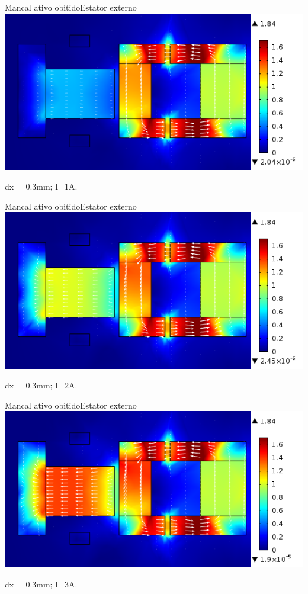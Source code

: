 \documentclass{beamer}
\begin{document}
\begin{frame}{Mancal ativo obitido}{Estator externo}
\includegraphics[width=1\linewidth]{Simulacoes/Ativo/dx=03_I=1}

dx = 0.3mm; I=1A.
\end{frame}

\begin{frame}{Mancal ativo obitido}{Estator externo}
\includegraphics[width=1\linewidth]{Simulacoes/Ativo/dx=03_I=2}

dx = 0.3mm; I=2A.
\end{frame}

\begin{frame}{Mancal ativo obitido}{Estator externo}
\includegraphics[width=1\linewidth]{Simulacoes/Ativo/dx=03_I=3}

dx = 0.3mm; I=3A.
\end{frame}
\end{document}

